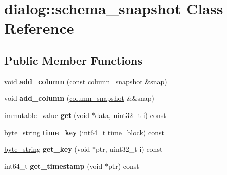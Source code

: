 \hypertarget{classdialog_1_1schema__snapshot}{}\section{dialog\+:\+:schema\+\_\+snapshot Class Reference}
\label{classdialog_1_1schema__snapshot}
\subsection*{Public Member Functions}
\begin{DoxyCompactItemize}
\item 
\mbox{\label{classdialog_1_1schema__snapshot_aea4b72c16d4162dc3aa8f39c91dfcb42}} 
void {\bfseries add\+\_\+column} (const \hyperlink{structdialog_1_1column__snapshot}{column\+\_\+snapshot} \&snap)
\item 
\mbox{\label{classdialog_1_1schema__snapshot_a87bd62d544210963ffb74c52622e9cb5}} 
void {\bfseries add\+\_\+column} (\hyperlink{structdialog_1_1column__snapshot}{column\+\_\+snapshot} \&\&snap)
\item 
\mbox{\label{classdialog_1_1schema__snapshot_a3cee2c051eac2710ec43c0a408a51bd2}} 
\hyperlink{classdialog_1_1immutable__value}{immutable\+\_\+value} {\bfseries get} (void $\ast$\hyperlink{structdialog_1_1data}{data}, uint32\+\_\+t i) const
\item 
\mbox{\label{classdialog_1_1schema__snapshot_ab2f1ea047cd452a4680ad7a983faed04}} 
\hyperlink{classdialog_1_1byte__string}{byte\+\_\+string} {\bfseries time\+\_\+key} (int64\+\_\+t time\+\_\+block) const
\item 
\mbox{\label{classdialog_1_1schema__snapshot_a3344e99d830b3a893a0fdee9dd8b3e54}} 
\hyperlink{classdialog_1_1byte__string}{byte\+\_\+string} {\bfseries get\+\_\+key} (void $\ast$ptr, uint32\+\_\+t i) const
\item 
\mbox{\label{classdialog_1_1schema__snapshot_adb267a251f09fe544f5562c2dc2ba379}} 
int64\+\_\+t {\bfseries get\+\_\+timestamp} (void $\ast$ptr) const
\item 

\end{DoxyCompactItemize}

